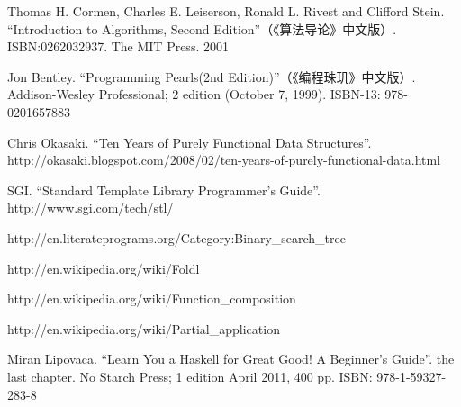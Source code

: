 \documentclass[UTF8]{article}
\begin{document}
\begin{thebibliography}{99}

Thomas H. Cormen, Charles E. Leiserson, Ronald L. Rivest and Clifford Stein.
``Introduction to Algorithms, Second Edition''（《算法导论》中文版）. ISBN:0262032937. The MIT Press. 2001

Jon Bentley. ``Programming Pearls(2nd Edition)''（《编程珠玑》中文版）. Addison-Wesley Professional; 2 edition (October 7, 1999). ISBN-13: 978-0201657883

Chris Okasaki. ``Ten Years of Purely Functional Data Structures''. http://okasaki.blogspot.com/2008/02/ten-years-of-purely-functional-data.html

SGI. ``Standard Template Library Programmer's Guide''. http://www.sgi.com/tech/stl/

http://en.literateprograms.org/Category:Binary\_search\_tree

http://en.wikipedia.org/wiki/Foldl

http://en.wikipedia.org/wiki/Function\_composition

http://en.wikipedia.org/wiki/Partial\_application

Miran Lipovaca. ``Learn You a Haskell for Great Good! A Beginner's Guide''. the last chapter. No Starch Press; 1 edition April 2011, 400 pp. ISBN: 978-1-59327-283-8

\end{thebibliography}

\ifx\wholebook\relax\else
\end{document}
